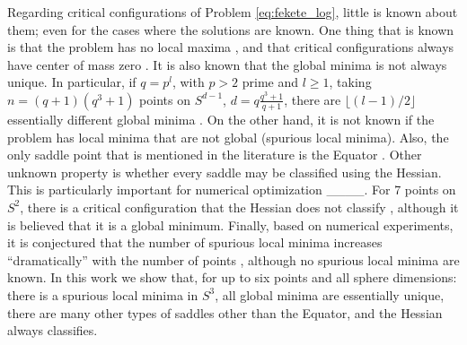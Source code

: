     Regarding critical configurations of Problem \eqref{eq:fekete_log}, little is known about them; even for the cases where the solutions are known.
    One thing that is known is that the problem has no local maxima \cite[Corollary 1.3]{beltran2013}, and that critical configurations always have center of mass zero \cite[Proposition 2]{dragnev2002}.
    It is also known that the global minima is not always unique. In particular, if $q=p^l$, with $p>2$ prime and $l \geq 1$, taking $n=(q+1)(q^3+1)$ points on $S^{d-1}$, $d=q \frac{q^3+1}{q+1}$, there are $\lfloor (l-1)/2 \rfloor$ essentially different global minima \cite[Section 1]{ballinger2009}.
    On the other hand, it is not known if the problem has local minima that are not global (spurious local minima). Also, the only saddle point that is mentioned in the literature is the Equator \cite[Section 2]{shub1993}.
    Other unknown property is whether every saddle may be classified using the Hessian. This is particularly important for numerical optimization ____. For 7 points on $S^2$, there is a critical configuration that the Hessian does not classify \cite[Remark 6.3]{constantineau2023}, although it is believed that it is a global minimum.
    Finally, based on numerical experiments, it is conjectured that the number of spurious local minima increases ``dramatically'' with the number of points \cite[Section 4]{rakhmanov1995}, although no spurious local minima are known.
    In this work we show that, for up to six points and all sphere dimensions: there is a spurious local minima in $S^3$, all global minima are essentially unique, there are many other types of saddles other than the Equator, and the Hessian always classifies.